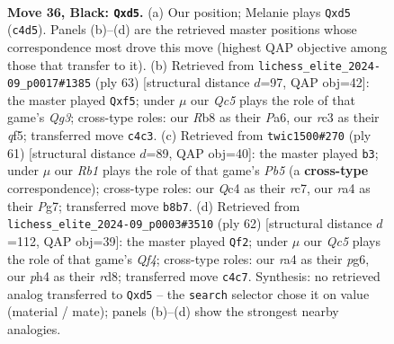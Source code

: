 \documentclass[11pt]{article}
\begin{document}
\clearpage

\begin{figure}[p]\centering
\begin{subfigure}{0.46\textwidth}\centering
\resizebox{\linewidth}{!}{%
\newchessgame
\chessboard[
  setfen={1rn5/5k2/p2p2pQ/3Pr2p/Rpq1p2P/2R5/4NPP1/5K2 b - - 4 36},
  showmover=false,
  pgfstyle=straightmove, color=movearrow, markmove={c4-d5}
]}
\caption{}
\end{subfigure}\hfill
\begin{subfigure}{0.46\textwidth}\centering
\resizebox{\linewidth}{!}{%
\newchessgame
\chessboard[
  setfen={8/4r1pk/p1R2pq1/5Q1p/1p1Nn3/4P3/PP3PPP/6K1 b - - 1 32},
  showmover=false,
  pgfstyle=straightmove, color=movearrow, markmove={g6-f5}
]}
\caption{}
\end{subfigure}
\\[4pt]
\begin{subfigure}{0.46\textwidth}\centering
\resizebox{\linewidth}{!}{%
\newchessgame
\chessboard[
  setfen={4q1k1/2R2rp1/2nR1p1p/4pN1Q/1p2P3/4P2P/2r3P1/6K1 b - - 1 31},
  showmover=false,
  pgfstyle=straightmove, color=movearrow, markmove={b4-b3}
]}
\caption{}
\end{subfigure}\hfill
\begin{subfigure}{0.46\textwidth}\centering
\resizebox{\linewidth}{!}{%
\newchessgame
\chessboard[
  setfen={k2r4/1p3pp1/5np1/P2P4/2PqrQ2/6P1/R6P/2R4K w - - 0 32},
  showmover=false,
  pgfstyle=straightmove, color=movearrow, markmove={f4-f2}
]}
\caption{}
\end{subfigure}
\caption{\textbf{Move 36, Black: \texttt{Qxd5}.} (a) Our position; Melanie plays \texttt{Qxd5} (\texttt{c4d5}). Panels (b)--(d) are the retrieved master positions whose correspondence most drove this move (highest QAP objective among those that transfer to it). (b) Retrieved from \texttt{lichess\_elite\_2024-09\_p0017\#1385} (ply 63) [structural distance $d$=97, QAP obj=42]: the master played \texttt{Qxf5}; under $\mu$ our \emph{Qc5} plays the role of that game's \emph{Qg3}; cross-type roles: our \emph{R}b8 as their \emph{P}a6, our \emph{r}c3 as their \emph{q}f5; transferred move \texttt{c4c3}. (c) Retrieved from \texttt{twic1500\#270} (ply 61) [structural distance $d$=89, QAP obj=40]: the master played \texttt{b3}; under $\mu$ our \emph{Rb1} plays the role of that game's \emph{Pb5} (a \textbf{cross-type} correspondence); cross-type roles: our \emph{Q}c4 as their \emph{r}c7, our \emph{r}a4 as their \emph{P}g7; transferred move \texttt{b8b7}. (d) Retrieved from \texttt{lichess\_elite\_2024-09\_p0003\#3510} (ply 62) [structural distance $d$=112, QAP obj=39]: the master played \texttt{Qf2}; under $\mu$ our \emph{Qc5} plays the role of that game's \emph{Qf4}; cross-type roles: our \emph{r}a4 as their \emph{p}g6, our \emph{p}h4 as their \emph{r}d8; transferred move \texttt{c4c7}. Synthesis: no retrieved analog transferred to \texttt{Qxd5} -- the \texttt{search} selector chose it on value (material / mate); panels (b)--(d) show the strongest nearby analogies.}
\label{fig:thought-m71}
\end{figure}
\end{document}
